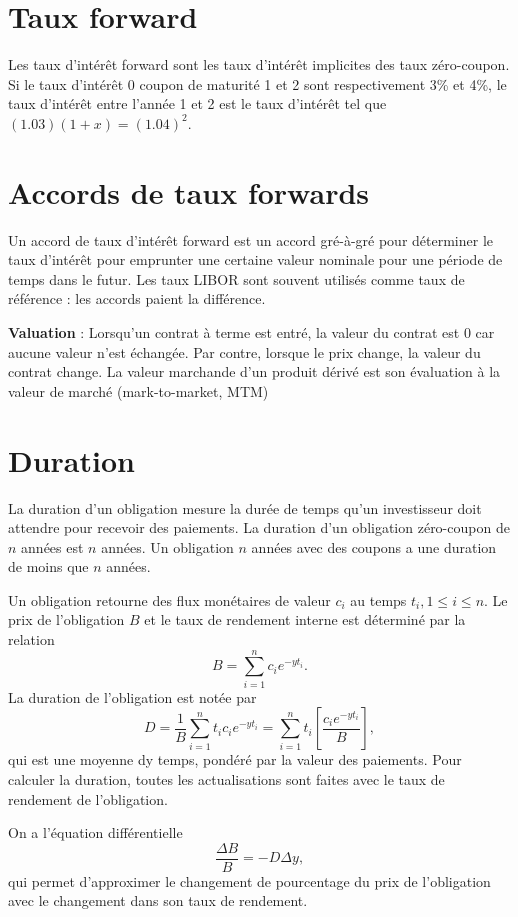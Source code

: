 \section{Taux forward}

Les taux d'intérêt forward sont les taux d'intérêt implicites des taux zéro-coupon. Si le taux d'intérêt 0 coupon de maturité 1 et 2 sont respectivement 3\% et 4\%, le taux d'intérêt entre l'année 1 et 2 est le taux d'intérêt tel que $(1.03)(1+x) = (1.04)^2$. 

\section{Accords de taux forwards}

Un accord de taux d'intérêt forward est un accord gré-à-gré pour déterminer le taux d'intérêt pour emprunter une certaine valeur nominale pour une période de temps dans le futur. Les taux LIBOR sont souvent utilisés comme taux de référence : les accords paient la différence. 

\textbf{Valuation} : Lorsqu'un contrat à terme est entré, la valeur du contrat est 0 car aucune valeur n'est échangée. Par contre, lorsque le prix change, la valeur du contrat change. La valeur marchande d'un produit dérivé est son évaluation à la valeur de marché (mark-to-market, MTM)

\section{Duration}

La duration d'un obligation mesure la durée de temps qu'un investisseur doit attendre pour recevoir des paiements. La duration d'un obligation zéro-coupon de $n$ années est $n$ années. Un obligation $n$ années avec des coupons a une duration de moins que $n$ années. 

Un obligation retourne des flux monétaires de valeur $c_i$ au temps $t_i, 1\leq i\leq n$. Le prix de l'obligation $B$ et le taux de rendement interne est déterminé par la relation
$$B = \sum_{i = 1}^{n}c_i e^{-yt_i}.$$
La duration de l'obligation est notée par 
$$D = \frac{1}{B} \sum_{i = 1}^{n}t_ic_ie^{-yt_i} = \sum_{i = 1}^{n} t_i \left[\frac{c_i e^{-yt_i}}{B}\right],$$
qui est une moyenne dy temps, pondéré par la valeur des paiements. Pour calculer la duration, toutes les actualisations sont faites avec le taux de rendement de l'obligation. 

On a l'équation différentielle 
$$\frac{\Delta B}{B} = -D\Delta y,$$
qui permet d'approximer le changement de pourcentage du prix de l'obligation avec le changement dans son taux de rendement. 


